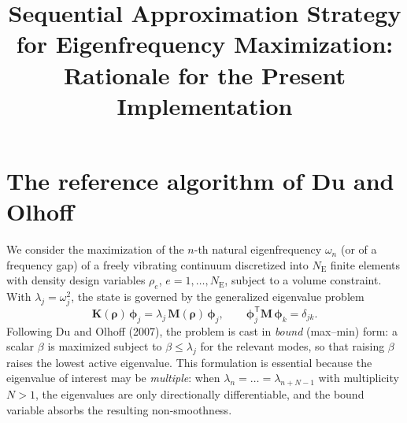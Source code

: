 \documentclass[11pt]{article}
\title{Sequential Approximation Strategy for Eigenfrequency
Maximization:\\ Rationale for the Present Implementation}
\author{}
\date{}
\newcommand{\rhov}{\bm{\rho}}
\newcommand{\Krho}{\mathbf{K}}
\newcommand{\Mrho}{\mathbf{M}}
\newcommand{\phiv}{\bm{\phi}}
\newcommand{\NE}{N_{\mathrm{E}}}
\newcommand{\T}{^{\mathsf{T}}}
\begin{document}
\maketitle

\section{The reference algorithm of Du and Olhoff}

We consider the maximization of the $n$-th natural eigenfrequency
$\omega_n$ (or of a frequency gap) of a freely vibrating continuum
discretized into $\NE$ finite elements with density design variables
$\rho_e$, $e=1,\dots,\NE$, subject to a volume constraint. With
$\lambda_j=\omega_j^2$, the state is governed by the generalized
eigenvalue problem
\begin{equation}
\Krho(\rhov)\,\phiv_j = \lambda_j\,\Mrho(\rhov)\,\phiv_j,
\qquad \phiv_j\T\Mrho\,\phiv_k=\delta_{jk}.
\label{eq:gevp}
\end{equation}
Following Du and Olhoff (2007), the problem is cast in \emph{bound}
(max--min) form: a scalar $\beta$ is maximized subject to
$\beta\le\lambda_j$ for the relevant modes, so that raising $\beta$
raises the lowest active eigenvalue. This formulation is essential
because the eigenvalue of interest may be \emph{multiple}: when
$\lambda_n=\dots=\lambda_{n+N-1}$ with multiplicity $N>1$, the
eigenvalues are only directionally differentiable, and the bound
variable absorbs the resulting non-smoothness.
\end{document}
